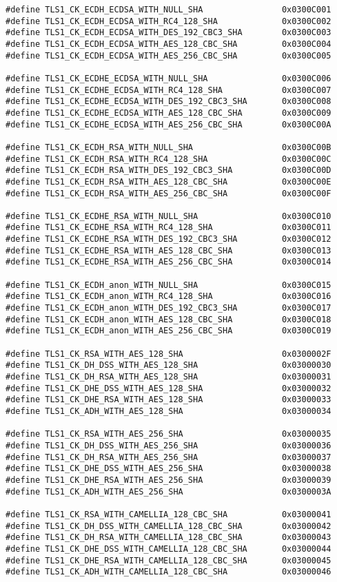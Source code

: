 \begin{lstlisting}[style=customc,caption=constantes protocole TLS, label=constantes-TLS]
#define TLS1_CK_ECDH_ECDSA_WITH_NULL_SHA                0x0300C001
#define TLS1_CK_ECDH_ECDSA_WITH_RC4_128_SHA             0x0300C002
#define TLS1_CK_ECDH_ECDSA_WITH_DES_192_CBC3_SHA        0x0300C003
#define TLS1_CK_ECDH_ECDSA_WITH_AES_128_CBC_SHA         0x0300C004
#define TLS1_CK_ECDH_ECDSA_WITH_AES_256_CBC_SHA         0x0300C005

#define TLS1_CK_ECDHE_ECDSA_WITH_NULL_SHA               0x0300C006
#define TLS1_CK_ECDHE_ECDSA_WITH_RC4_128_SHA            0x0300C007
#define TLS1_CK_ECDHE_ECDSA_WITH_DES_192_CBC3_SHA       0x0300C008
#define TLS1_CK_ECDHE_ECDSA_WITH_AES_128_CBC_SHA        0x0300C009
#define TLS1_CK_ECDHE_ECDSA_WITH_AES_256_CBC_SHA        0x0300C00A

#define TLS1_CK_ECDH_RSA_WITH_NULL_SHA                  0x0300C00B
#define TLS1_CK_ECDH_RSA_WITH_RC4_128_SHA               0x0300C00C
#define TLS1_CK_ECDH_RSA_WITH_DES_192_CBC3_SHA          0x0300C00D
#define TLS1_CK_ECDH_RSA_WITH_AES_128_CBC_SHA           0x0300C00E
#define TLS1_CK_ECDH_RSA_WITH_AES_256_CBC_SHA           0x0300C00F

#define TLS1_CK_ECDHE_RSA_WITH_NULL_SHA                 0x0300C010
#define TLS1_CK_ECDHE_RSA_WITH_RC4_128_SHA              0x0300C011
#define TLS1_CK_ECDHE_RSA_WITH_DES_192_CBC3_SHA         0x0300C012
#define TLS1_CK_ECDHE_RSA_WITH_AES_128_CBC_SHA          0x0300C013
#define TLS1_CK_ECDHE_RSA_WITH_AES_256_CBC_SHA          0x0300C014

#define TLS1_CK_ECDH_anon_WITH_NULL_SHA                 0x0300C015
#define TLS1_CK_ECDH_anon_WITH_RC4_128_SHA              0x0300C016
#define TLS1_CK_ECDH_anon_WITH_DES_192_CBC3_SHA         0x0300C017
#define TLS1_CK_ECDH_anon_WITH_AES_128_CBC_SHA          0x0300C018
#define TLS1_CK_ECDH_anon_WITH_AES_256_CBC_SHA          0x0300C019

#define TLS1_CK_RSA_WITH_AES_128_SHA                    0x0300002F
#define TLS1_CK_DH_DSS_WITH_AES_128_SHA                 0x03000030
#define TLS1_CK_DH_RSA_WITH_AES_128_SHA                 0x03000031
#define TLS1_CK_DHE_DSS_WITH_AES_128_SHA                0x03000032
#define TLS1_CK_DHE_RSA_WITH_AES_128_SHA                0x03000033
#define TLS1_CK_ADH_WITH_AES_128_SHA                    0x03000034

#define TLS1_CK_RSA_WITH_AES_256_SHA                    0x03000035
#define TLS1_CK_DH_DSS_WITH_AES_256_SHA                 0x03000036
#define TLS1_CK_DH_RSA_WITH_AES_256_SHA                 0x03000037
#define TLS1_CK_DHE_DSS_WITH_AES_256_SHA                0x03000038
#define TLS1_CK_DHE_RSA_WITH_AES_256_SHA                0x03000039
#define TLS1_CK_ADH_WITH_AES_256_SHA                    0x0300003A

#define TLS1_CK_RSA_WITH_CAMELLIA_128_CBC_SHA           0x03000041
#define TLS1_CK_DH_DSS_WITH_CAMELLIA_128_CBC_SHA        0x03000042
#define TLS1_CK_DH_RSA_WITH_CAMELLIA_128_CBC_SHA        0x03000043
#define TLS1_CK_DHE_DSS_WITH_CAMELLIA_128_CBC_SHA       0x03000044
#define TLS1_CK_DHE_RSA_WITH_CAMELLIA_128_CBC_SHA       0x03000045
#define TLS1_CK_ADH_WITH_CAMELLIA_128_CBC_SHA           0x03000046
\end{lstlisting}

